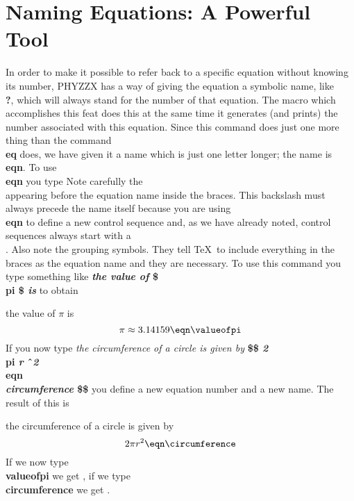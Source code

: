 \section{Naming Equations: A Powerful Tool}
 
In order to make it possible to refer back to a specific equation
without knowing its number, PHYZZX has a way of giving the equation
a symbolic name, like {\bf \\?}, which will always stand for the
number of that equation.
The macro which accomplishes this feat does this at the same time
it generates (and prints) the number associated with this
equation.
Since this command does just one more thing than the command
{\bf \\eq} does, we have given it a name which is just one
letter longer; the name is {\bf \\eqn}.
To use {\bf \\eqn} you type
Note carefully the \\ appearing before the equation name inside the
braces.
This backslash must always precede the name itself because you
are using {\bf \\eqn} to define a new control sequence and, as
we have already noted, control sequences always start with a \\ .
Also note the grouping symbols.
They tell \TeX\ to include everything in the braces as the
equation name and they are necessary.
To use this command you type something like \nextline
{\bf {\it the value of} \$ \\pi \$ {\it is}} \nextline
{}
to obtain \nextline
 
the value of $\pi$ is
$$ \pi \approx 3.14159 \eqn\valueofpi $$
If you now type       \nextline
{\it the circumference of a circle is given by} \nextline
{\bf \$\$ {\it 2} \\pi {\it r}
\^\  {\it 2} \\eqn\\{\it circumference} \$\$ }\nextline
you define a new equation number and a new name.
The result of this is  \nextline
 
\noindent the circumference of a circle is given by
$$  2\pi r^2 \eqn\circumference $$
If we now type {\bf \\valueofpi} we get  ,
if we type {\bf \\circumference} we get \circumference .
 
